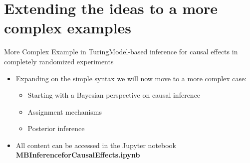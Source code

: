 \documentclass[AERbeamer%
              ,optEnglish%
              ,optBiber%
              ,optBibstyleAlphabetic%
              ,optBeamerClassicFormat%
              ]{AERlatex}%
\begin{document}
\section{Extending the ideas to a more complex examples}


\begin{frame}[c]{More Complex Example in Turing}{Model-based inference for causal effects in completely randomized experiments}
    \centering
    \begin{itemize}
        \item Expanding on the simple syntax we will now move to a more complex case:
        \begin{itemize}
            \item Starting with a Bayesian perspective on causal inference
            \item Assignment mechanisms
            \item Posterior inference
        \end{itemize}
        \item All content can be accessed in the Jupyter notebook \textbf{MBInferenceforCausalEffects.ipynb}
    \end{itemize}
\end{frame}






%
%
%
%
\end{document}
